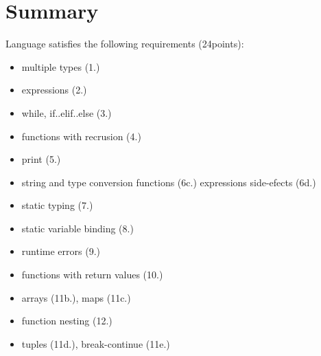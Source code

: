 \documentclass{article}
\begin{document}
\section{Summary}
Language satisfies the following requirements (24points):
\begin{itemize}
  \item multiple types (1.)
  \item expressions (2.)
  \item while, if..elif..else (3.)
  \item functions with recrusion (4.)
  \item print (5.)
  \item string and type conversion functions (6c.) expressions side-efects (6d.)
  \item static typing (7.)
  \item static variable binding (8.)
  \item runtime errors (9.)
  \item functions with return values (10.)
  \item arrays (11b.), maps (11c.)
  \item function nesting (12.)
  \item tuples (11d.), break-continue (11e.)
\end{itemize}
\end{document}
